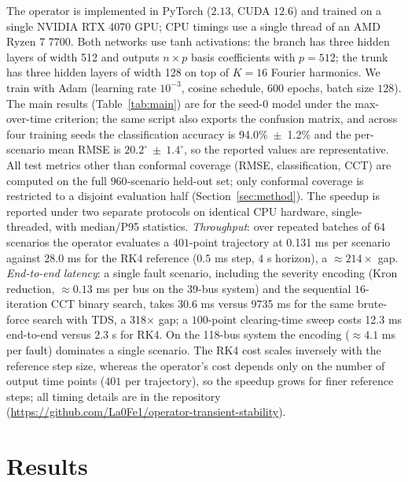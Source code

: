 \documentclass[5p,times]{elsarticle}
\newcommand{\accSeed}{94.0\%~$\pm$~1.2\%} %
\newcommand{\timCPU}{0.131}           %
\newcommand{\timRK}{28.0}             %
\newcommand{\timSU}{214}              %
\newcommand{\latEnd}{30.6}            %
\newcommand{\latRK}{9735}             %
\newcommand{\latSU}{318}              %
\newcommand{\latSweep}{12.3}          %
\begin{document}
The operator is implemented in PyTorch ($2.13$, CUDA $12.6$) and trained on a single NVIDIA RTX
4070 GPU; CPU timings use a single thread of an AMD Ryzen 7 7700. Both networks use tanh
activations: the branch has three hidden layers of width 512 and outputs $n\times p$ basis
coefficients with $p=512$; the trunk has three hidden layers of width 128 on top of $K=16$
Fourier harmonics. We train with Adam (learning rate $10^{-3}$, cosine schedule, $600$ epochs,
batch size $128$). The main results (Table~\ref{tab:main}) are for the seed-0 model under the
max-over-time criterion; the same script also exports the confusion matrix, and across four
training seeds the classification accuracy is \accSeed{} and the per-scenario mean RMSE is
$20.2^\circ~\pm~1.4^\circ$, so the reported values are representative. All test metrics other than
conformal coverage (RMSE, classification, CCT) are computed on the full $960$-scenario held-out
set; only conformal coverage is restricted to a disjoint evaluation half
(Section~\ref{sec:method}). The speedup is reported under two separate protocols on identical CPU hardware,
single-threaded, with median/P95 statistics.
\emph{Throughput}: over repeated batches of $64$ scenarios the operator evaluates a $401$-point
trajectory at \timCPU{} ms per scenario against \timRK{} ms for the RK4 reference ($0.5$ ms step,
$4$ s horizon), a $\approx\timSU{}\times$ gap. \emph{End-to-end latency}: a single fault
scenario, including the severity encoding (Kron reduction, $\approx0.13$ ms per bus on the 39-bus
system) and the sequential $16$-iteration CCT binary search, takes \latEnd{} ms versus
\latRK{} ms for the same brute-force search with TDS, a \latSU{}$\times$ gap; a $100$-point
clearing-time sweep costs \latSweep{} ms end-to-end versus $2.3$ s for RK4. On the 118-bus system
the encoding ($\approx4.1$ ms per fault) dominates a single scenario. The RK4 cost scales
inversely with the reference step size, whereas the operator's cost depends only on the number of
output time points ($401$ per trajectory), so the speedup grows for finer reference steps; all
timing details are in the repository (\url{https://github.com/La0Fe1/operator-transient-stability}).

\section{Results}
\label{sec:results}
\end{document}
